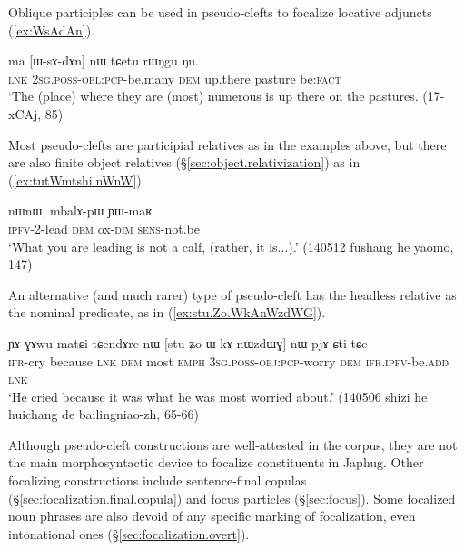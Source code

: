 Oblique participles can be used in pseudo-clefts to focalize locative adjuncts (\ref{ex:WsAdAn}).
 
\begin{exe}
\ex \label{ex:WsAdAn}
\gll  ma [ɯ-sɤ-dɤn] nɯ tɕetu rɯŋgu ŋu. \\
\textsc{lnk} \textsc{2sg}.\textsc{poss}-\textsc{obl}:\textsc{pcp}-be.many \textsc{dem} up.there pasture be:\textsc{fact} \\
\glt `The (place) where they are (most) numerous is up there on the pastures. (17-xCAj, 85)
\end{exe}

 Most pseudo-clefts are participial relatives as in the examples above, but there are also finite object relatives (§\ref{sec:object.relativization}) as in (\ref{ex:tutWmtshi.nWnW}).
 
\begin{exe}
\ex \label{ex:tutWmtshi.nWnW}
\gll  [tu-tɯ-mtsʰi] nɯnɯ, mbalɤ-pɯ ɲɯ-maʁ \\
\textsc{ipfv}-2-lead \textsc{dem} ox-\textsc{dim} \textsc{sens}-not.be \\
\glt `What you are leading is not a calf, (rather, it is...).' (140512 fushang he yaomo, 147)
\end{exe}

An alternative (and much rarer) type of pseudo-cleft has the headless relative as the nominal predicate, as in (\ref{ex:stu.Zo.WkAnWzdWG}).

\begin{exe}
\ex \label{ex:stu.Zo.WkAnWzdWG}
\gll ɲɤ-ɣɤwu matɕi tɕendɤre nɯ [stu ʑo ɯ-kɤ-nɯzdɯɣ] nɯ pjɤ-ɕti tɕe  \\
\textsc{ifr}-cry because \textsc{lnk} \textsc{dem} most \textsc{emph} \textsc{3sg}.\textsc{poss}-\textsc{obj}:\textsc{pcp}-worry \textsc{dem} \textsc{ifr}.\textsc{ipfv}-be.\textsc{add} \textsc{lnk} \\
\glt `He cried because it was what he was most worried about.' (140506 shizi he huichang de bailingniao-zh, 65-66)
\end{exe}
 
Although pseudo-cleft constructions are well-attested in the corpus, they are not the main morphosyntactic device to focalize constituents in Japhug. Other focalizing constructions include sentence-final copulas (§\ref{sec:focalization.final.copula}) and focus particles (§\ref{sec:focus}). Some focalized noun phrases are also devoid of any specific marking of focalization, even intonational ones (§\ref{sec:focalization.overt}).

